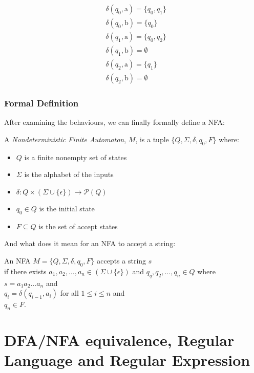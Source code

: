 \documentclass[11pt]{article}
\begin{document}
\begin{align*}
&\delta(q_0, \mathrm{a}) = \{q_0,q_1\} \\
&\delta(q_0, \mathrm{b}) = \{q_0\} \\
&\delta(q_1, \mathrm{a}) = \{q_0,q_2\} \\
&\delta(q_1, \mathrm{b}) = \emptyset \\
&\delta(q_2, \mathrm{a}) = \{q_1\} \\
&\delta(q_2, \mathrm{b}) = \emptyset
\end{align*}

\subsubsection{Formal Definition}

After examining the behaviours, we can finally formally define a NFA:
\begin{definition}
A \emph{Nondeterministic Finite Automaton}, $M$, is a tuple $\{Q,\Sigma,\delta,q_0,F\}$ where:
\begin{itemize}
\item $Q$ is a finite nonempty set of states
\item $\Sigma$ is the alphabet of the inputs
\item $\delta : Q \times (\Sigma \cup \{\epsilon\}) \rightarrow \mathcal{P}(Q)$
\item $q_0 \in Q$ is the initial state
\item $F \subseteq Q$ is the set of accept states
\end{itemize}
\end{definition}

And what does it mean for an NFA to accept a string:
\begin{definition}
An NFA $M = \{Q,\Sigma,\delta,q_0,F\}$ accepts a string $s$ \\
if there exists
$a_1,a_2,\dots,a_n \in (\Sigma \cup \{\epsilon\})$ and
$q_q,q_2,\dots,q_n \in Q$ where \\
$s = a_1 a_2 \dots a_n$ and \\
$q_i = \delta(q_{i-1},a_i)$ for all $1 \leq i \leq n$ and \\
$q_n \in F$.
\end{definition}

\section{DFA/NFA equivalence, Regular Language and Regular Expression}
\end{document}
